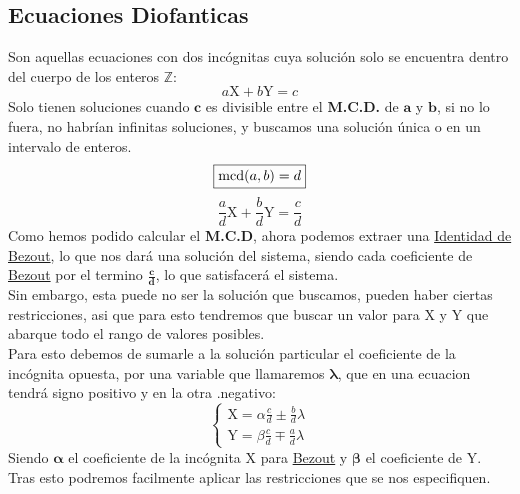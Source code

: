 \subsection{Ecuaciones Diofanticas}
\noindent Son aquellas ecuaciones con dos incógnitas cuya solución solo se encuentra dentro del cuerpo de los enteros \(\mathbf{\mathbb{Z}}\):
\[
        \boxed{a\mathrm{X} + b\mathrm{Y} = c}
\]
\noindent Solo tienen soluciones cuando \(\mathbf{c}\) es divisible entre el \textbf{M.C.D.} de \(\mathbf{a}\) y \(\mathbf{b}\), si no lo fuera, no habrían infinitas soluciones, y buscamos una solución única o en un intervalo de enteros.
\[
        \boxed{\textnormal{mcd}(a,b) = d}
\]
\[
        \boxed{\frac{a}{d}\mathrm{X} + \frac{b}{d}\mathrm{Y} = \frac{c}{d}}
\]
\noindent Como hemos podido calcular el \textbf{M.C.D}, ahora podemos extraer una \underline{Identidad de Bezout}, lo que nos dará una solución del sistema, siendo cada coeficiente de \underline{Bezout} por el termino \(\mathbf{\frac{c}{d}}\), lo que satisfacerá el sistema.\\ Sin embargo, esta puede no ser la solución que buscamos, pueden haber ciertas restricciones, asi que para esto tendremos que buscar un valor para \(\mathbf{\mathrm{X}}\) y \(\mathbf{\mathrm{Y}}\) que abarque todo el rango de valores posibles. \\ Para esto debemos de sumarle a la solución particular el coeficiente de la incógnita opuesta, por una variable que llamaremos \(\mathbf{\lambda}\), que en una ecuacion tendrá signo positivo y en la otra .negativo:
\[
        \boxed{\begin{cases}
                        \mathrm{X} = \alpha \frac{c}{d} \pm \frac{b}{d}\lambda \\
                        \mathrm{Y} = \beta \frac{c}{d}\mp \frac{a}{d}\lambda
                \end{cases}}
\]
\noindent Siendo \(\mathbf{\alpha}\) el coeficiente de la incógnita \(\mathbf{\mathrm{X}}\) para \underline{Bezout} y \(\mathbf{\beta}\) el coeficiente de \(\mathbf{\mathrm{Y}}\).\\ Tras esto podremos facilmente aplicar las restricciones que se nos especifiquen.
